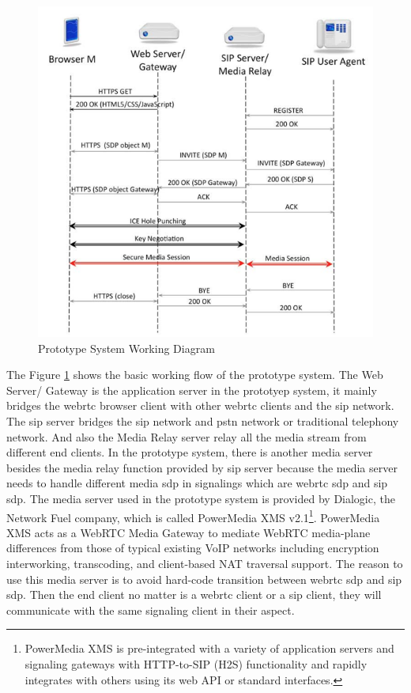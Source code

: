 \begin{figure}
	\centering
    	\includegraphics[width=0.60\textheight,natwidth=610,natheight=642]{figs/system_work_flow.png}
  	\caption{Prototype System Working Diagram \cite{inbook:sys_work_diagram}}
  	\label{fig:sys_work_diagram}
\end{figure}

\par The Figure \ref{fig:sys_work_diagram} shows the basic working flow of the prototype system. The Web Server/ Gateway is the application server in the prototyep system, it mainly bridges the \gls{webrtc} browser client with other \gls{webrtc} clients and the \gls{sip} network. The \gls{sip} server bridges the \gls{sip} network and \gls{pstn} network or traditional telephony network. And also the Media Relay server relay all the media stream from different end clients. In the prototype system, there is another media server besides the media relay function provided by \gls{sip} server because the media server needs to handle different media \gls{sdp} in signalings which are \gls{webrtc} \gls{sdp} and \gls{sip} \gls{sdp}. The media server used in the prototype system is provided by Dialogic, the Network Fuel company, which is called PowerMedia XMS v2.1\footnote{PowerMedia XMS is pre-integrated with a variety of application servers and signaling gateways with HTTP-to-SIP (H2S) functionality and rapidly integrates with others using its web API or standard interfaces.}. PowerMedia XMS acts as a WebRTC Media Gateway to mediate WebRTC media-plane differences from those of typical existing VoIP networks including encryption interworking, transcoding, and client-based NAT traversal support. The reason to use this media server is to avoid hard-code transition between \gls{webrtc} \gls{sdp} and \gls{sip} \gls{sdp}. Then the end client no matter is a \gls{webrtc} client or a \gls{sip} client, they will communicate with the same signaling client in their aspect.

